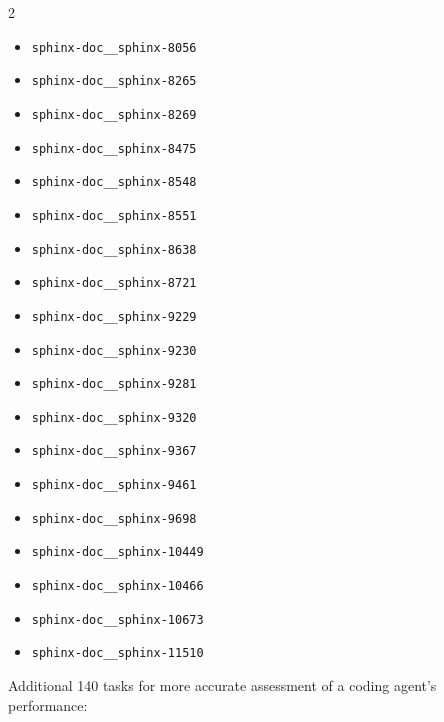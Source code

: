 \documentclass{article} %
\begin{document}
\begin{multicols}{2}
\begin{itemize}
  \item \texttt{sphinx-doc\_\_sphinx-8056}
  \item \texttt{sphinx-doc\_\_sphinx-8265}
  \item \texttt{sphinx-doc\_\_sphinx-8269}
  \item \texttt{sphinx-doc\_\_sphinx-8475}
  \item \texttt{sphinx-doc\_\_sphinx-8548}
  \item \texttt{sphinx-doc\_\_sphinx-8551}
  \item \texttt{sphinx-doc\_\_sphinx-8638}
  \item \texttt{sphinx-doc\_\_sphinx-8721}
  \item \texttt{sphinx-doc\_\_sphinx-9229}
  \item \texttt{sphinx-doc\_\_sphinx-9230}
  \item \texttt{sphinx-doc\_\_sphinx-9281}
  \item \texttt{sphinx-doc\_\_sphinx-9320}
  \item \texttt{sphinx-doc\_\_sphinx-9367}
  \item \texttt{sphinx-doc\_\_sphinx-9461}
  \item \texttt{sphinx-doc\_\_sphinx-9698}
  \item \texttt{sphinx-doc\_\_sphinx-10449}
  \item \texttt{sphinx-doc\_\_sphinx-10466}
  \item \texttt{sphinx-doc\_\_sphinx-10673}
  \item \texttt{sphinx-doc\_\_sphinx-11510}
\end{itemize}
\end{multicols}


Additional 140 tasks for more accurate assessment of a coding agent's performance:
\end{document}
